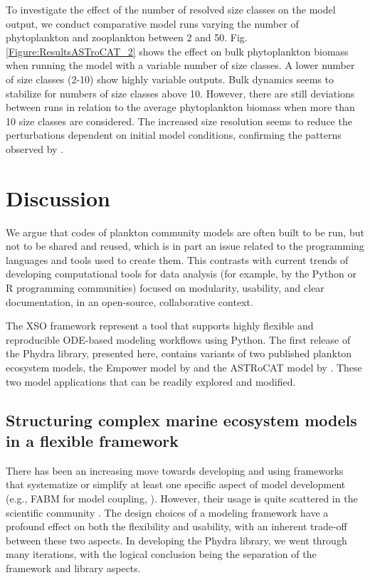 \documentclass[journal abbreviation, manuscript]{copernicus}
\begin{document}
To investigate the effect of the number of resolved size classes on the model output, we conduct comparative model runs varying the number of phytoplankton and zooplankton between 2 and 50.
Fig. \ref{Figure:ResultsASTroCAT_2} shows the effect on bulk phytoplankton biomass when running the model with a variable number of size classes. A lower number of size classes (2-10) show highly variable outputs. Bulk dynamics seems to stabilize for numbers of size classes above 10. However, there are still deviations between runs in relation to the average phytoplankton biomass when more than 10 size classes are considered. The increased size resolution seems to reduce the perturbations dependent on initial model conditions, confirming the patterns observed by \citet{Baird2010IncreasingErrors}.



\section{Discussion}

We argue that codes of plankton community models are often built to be run, but not to be shared and reused, which is in part an issue related to the programming languages and tools used to create them. This contrasts with current trends of developing computational tools for data analysis (for example, by the Python or R programming communities) focused on modularity, usability, and clear documentation, in an open-source, collaborative context. 

The XSO framework represent a tool that supports highly flexible and reproducible ODE-based modeling workflows using Python. The first release of the Phydra library, presented here, contains variants of two published plankton ecosystem models, the Empower model by \citet{Anderson2015c} and the ASTRoCAT model by \citet{Banas2011b}. These two model applications that can be readily explored and modified.


\subsection{Structuring complex marine ecosystem models in a flexible framework}

There has been an increasing move towards developing and using frameworks that systematize or simplify at least one specific aspect of model development (e.g., FABM for model coupling, \citet{Bruggeman2014a}). However, their usage is quite scattered in the scientific community \citep{Janssen2015ExploringPerspective}. The design choices of a modeling framework have a profound effect on both the flexibility and usability, with an inherent trade-off between these two aspects. In developing the Phydra library, we went through many iterations, with the logical conclusion being the separation of the framework and library aspects.
\end{document}
